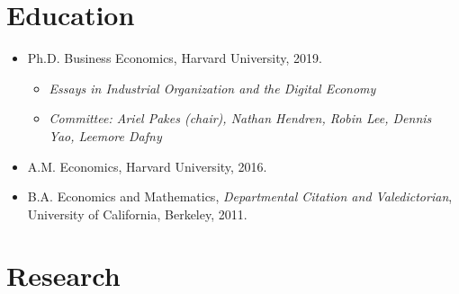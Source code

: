 \section*{Education}
\begin{itemize}
  \item Ph.D. Business Economics, Harvard University, 2019.
    \begin{itemize}
    \item \textit{Essays in Industrial Organization and the Digital Economy}
    \item \textit{Committee: Ariel Pakes (chair), Nathan Hendren, Robin Lee, Dennis Yao, Leemore Dafny}
    \end{itemize}
  \item A.M. Economics, Harvard University, 2016.
  \item B.A. Economics and Mathematics, \textit{Departmental Citation and Valedictorian},
    University of California, Berkeley, 2011. %
\end{itemize}
\vspace{0.03cm}
\section*{Research}
